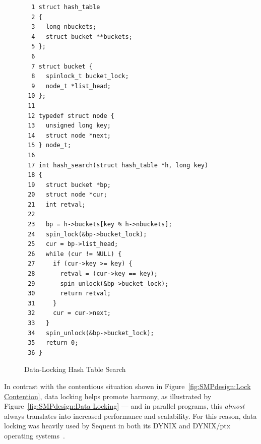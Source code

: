 \begin{figure}[htbp]
{ \scriptsize
\begin{verbatim}
  1 struct hash_table
  2 {
  3   long nbuckets;
  4   struct bucket **buckets;
  5 };
  6
  7 struct bucket {
  8   spinlock_t bucket_lock;
  9   node_t *list_head;
 10 };
 11
 12 typedef struct node {
 13   unsigned long key;
 14   struct node *next;
 15 } node_t;
 16
 17 int hash_search(struct hash_table *h, long key)
 18 {
 19   struct bucket *bp;
 20   struct node *cur;
 21   int retval;
 22
 23   bp = h->buckets[key % h->nbuckets];
 24   spin_lock(&bp->bucket_lock);
 25   cur = bp->list_head;
 26   while (cur != NULL) {
 27     if (cur->key >= key) {
 28       retval = (cur->key == key);
 29       spin_unlock(&bp->bucket_lock);
 30       return retval;
 31     }
 32     cur = cur->next;
 33   }
 34   spin_unlock(&bp->bucket_lock);
 35   return 0;
 36 }
\end{verbatim}
}
\caption{Data-Locking Hash Table Search}
\label{fig:SMPdesign:Data-Locking Hash Table Search}
\end{figure}

In contrast with the contentious situation
shown in Figure~\ref{fig:SMPdesign:Lock Contention},
data locking helps promote harmony, as illustrated by
Figure~\ref{fig:SMPdesign:Data Locking} --- and in parallel programs,
this \emph{almost} always translates into increased performance and
scalability.
For this reason, data locking was heavily used by Sequent in
both its DYNIX and DYNIX/ptx operating
systems~\cite{Beck85,Inman85,Garg90,Dove90,McKenney92b,McKenney92a,McKenney93}.

